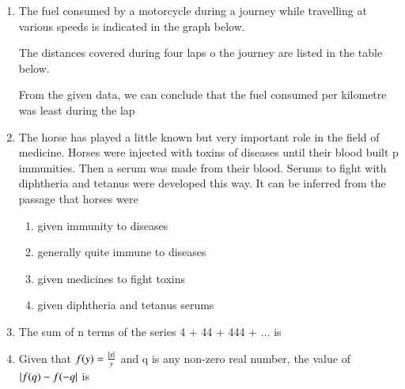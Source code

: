 \documentclass[journal,12pt,onecolumn]{IEEEtran}
\theoremstyle{remark}
\begin{document}
\begin{enumerate}
\begin{enumerate}
	\end{enumerate}
\item The fuel consumed by a motorcycle during a journey while travelling at various speeds is indicated in the graph below.
	\begin{figure}[H]
		\centering
		
		\caption{}
		\label{25}
	\end{figure}
	The distances covered during four laps o the journey are listed in the table below.
		
	From the given data, we can conclude that the fuel consumed per kilometre was least during the lap
	\begin{enumerate}
	\end{enumerate}
\item The horse has played a little known but very important role in the field of medicine. Horses were injected with toxins of diseases until their blood built p immunities. Then a serum was made from their blood. Serums to fight with diphtheria and tetanus were developed this way.
	It can be inferred from the passage that horses were
	\begin{enumerate}
		\item given immunity to diseases
		\item generally quite immune to diseases
		\item given medicines to fight toxins
		\item given diphtheria and tetanus serums
	\end{enumerate}
\item The sum of n terms of the series 4 + 44 + 444 + $\dots$ is
	\begin{enumerate}
	\end{enumerate}
\item Given that $f(y) = \frac{\left\vert y\right\vert}{y}$ and q is any non-zero real number, the value of $\left\vert f(q) - f(-q\right\vert$ is
	\begin{enumerate}
			\begin{multicols}{4}
			\item 0
			\item -1
			\item 1
			\item 2
			\end{multicols}
	\end{enumerate}

			
\end{enumerate}
\end{document}
